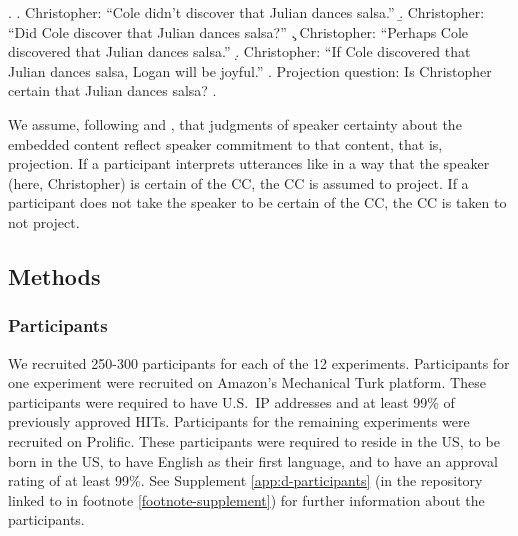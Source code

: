 \documentclass[a4paper,12pt,twoside]{article}
\begin{document}
	\ex. \label{ex:certain-that}
		\a. Christopher: ``Cole didn't discover that Julian dances salsa.''
		\b. Christopher: ``Did Cole discover that Julian dances salsa?''
		\c. Christopher: ``Perhaps Cole discovered that Julian dances salsa.''
		\d. Christopher: ``If Cole discovered that Julian dances salsa, Logan will be joyful.''
		\z.
		Projection question: Is Christopher certain that Julian dances salsa?
	\z.

    We assume, following \citet{tonhauser_how_2018} and \citet{degen_are_2022}, that judgments of speaker certainty about the embedded content reflect speaker commitment to that content, that is, projection. If a participant interprets utterances like \Last[a--d] in a way that the speaker (here, Christopher) is certain of the CC, the CC is assumed to project. If a participant does not take the speaker to be certain of the CC, the CC is taken to not project.



	\subsection{Methods}

		\subsubsection{Participants}
			We recruited 250-300 participants for each of the 12 experiments. Participants for one experiment were recruited on Amazon's Mechanical Turk platform. These participants were required to have U.S.\ IP addresses and at least 99\% of previously approved HITs. Participants for the remaining experiments were recruited on Prolific. These participants were required to reside in the US, to be born in the US, to have English as their first language, and to have an approval rating of at least 99\%. See Supplement \ref{app:d-participants} (in the repository linked to in footnote \ref{footnote-supplement}) for further information about the participants. 
			
\end{document}
